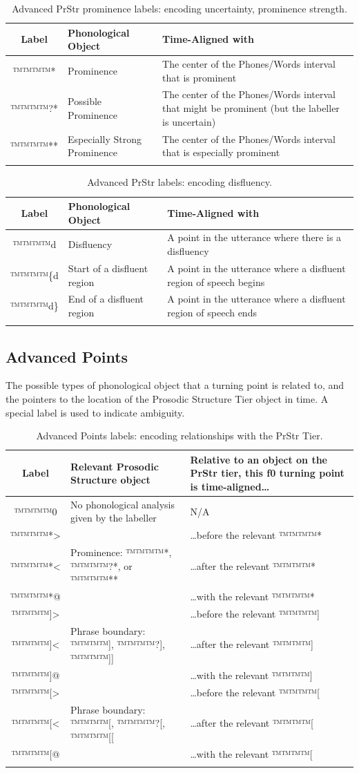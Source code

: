 \documentclass[11pt, twoside]{memoir}
\begin{document}
\begin{longtable}{cp{.3\linewidth}p{.45\linewidth}}
	\toprule
	\textbf{Label} & \textbf{Phonological Object} & \textbf{Time-Aligned with} \tabularnewline
	\midrule
	\endhead
	\rowcolor{green}
	™™™™{*} & Prominence & The center of the Phones/Words interval that is prominent\tabularnewline
	™™™™{?*} & Possible Prominence & The center of the Phones/Words interval that might be prominent (but the labeller is uncertain) \tabularnewline
	™™™™{**} & Especially Strong Prominence & The center of the Phones/Words interval that is especially prominent \tabularnewline
	\bottomrule
	\caption{Advanced PrStr prominence labels: encoding uncertainty, prominence strength.}
\end{longtable}

\begin{longtable}{cp{.3\linewidth}p{.45\linewidth}}
	\toprule
	\textbf{Label} & \textbf{Phonological Object} & \textbf{Time-Aligned with} \tabularnewline
	\midrule
	\endhead
	™™™™{d} & Disfluency & A point in the utterance where there is a disfluency\tabularnewline
	™™™™{\{d} & Start of a disfluent region & A point in the utterance where a disfluent region of speech begins\tabularnewline
	™™™™{d\}} & End of a disfluent region & A point in the utterance where a disfluent region of speech ends\tabularnewline
	\bottomrule
	\caption{Advanced PrStr labels: encoding disfluency.}
\end{longtable}


\subsection*{Advanced Points}

The possible types of phonological object that a turning point is related to, and the pointers to the location of the Prosodic Structure Tier object in time. A special label is used to indicate ambiguity.

\begin{longtable}{c>{\centering}p{.33\linewidth}>{\centering\arraybackslash}p{.45\linewidth}} \toprule \textbf{Label} & \textbf{Relevant Prosodic Structure object} & \textbf{Relative to an object on the PrStr tier, this f0 turning point is time-aligned…}\tabularnewline
\midrule \endhead
\rowcolor{green}™™™™{0} & No phonological analysis given by the labeller & N/A\tabularnewline
\midrule
™™™™{*>} & & …before the relevant ™™™™{*}\tabularnewline
™™™™{*<} & Prominence: ™™™™{*}, ™™™™{?*}, or ™™™™{**} & …after the relevant ™™™™{*}\tabularnewline
™™™™{*@} & & …with the relevant ™™™™{*}\tabularnewline
\midrule
™™™™{]>} & & …before the relevant ™™™™{]}\tabularnewline
™™™™{]<} & Phrase boundary: ™™™™{]}, ™™™™{?]}, ™™™™{]]} & …after the relevant ™™™™{]}\tabularnewline
™™™™{]@} & & …with the relevant ™™™™{]}\tabularnewline
\midrule
™™™™{[>} & & …before the relevant ™™™™{[}\tabularnewline
™™™™{[<} & Phrase boundary: ™™™™{[}, ™™™™{?[}, ™™™™{[[} & …after the relevant ™™™™{[}\tabularnewline
™™™™{[@} & & …with the relevant ™™™™{[}\tabularnewline
\bottomrule
\caption{Advanced Points labels: encoding relationships with the PrStr Tier.}
\end{longtable}
\end{document}
